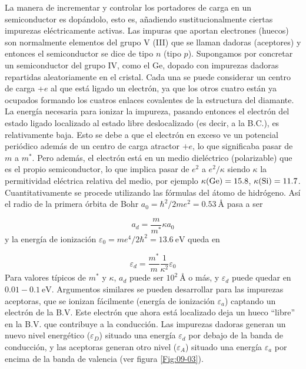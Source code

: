 La manera de incrementar y controlar los portadores de carga en un semiconductor es dopándolo, esto es, añadiendo sustitucionalmente ciertas impurezas eléctricamente activas. Las impuras que aportan electrones (huecos) son normalmente elementos del grupo V (III) que se llaman dadoras (aceptores) y entonces el semiconductor se dice de tipo $n$ (tipo $p$). Supongamos por concretar un semiconductor del grupo IV, como  el Ge, dopado con impurezas dadoras repartidas aleatoriamente en el cristal. Cada una se puede considerar un centro de carga +$e$ al que está ligado un electrón, ya que los otros cuatro están ya ocupados formando los cuatros enlaces covalentes de la estructura del diamante. La energía necesaria para ionizar la impureza, pasando entonces el electrón del estado ligado localizado al estado libre deslocalizado (es decir, a la B.C.), es relativamente baja. Esto se debe a que el electrón en exceso ve un potencial periódico además de un centro de carga atractor $+e$, lo que significaba pasar de $m$ a $m^*$. Pero además, el electrón está en un medio dieléctrico (polarizable) que es el propio semiconductor, lo que implica pasar de $e^2$ a $e^2/\kappa$ siendo $\kappa$ la permitividad eléctrica relativa del medio, por ejemplo $\kappa(\ce{Ge})=15.8$, $\kappa(\ce{Si})=11.7$. Cuantitativamente se procede utilizando las fórmulas del átomo de hidrógeno. Así el radio de la primera órbita de Bohr $a_0=\hbar^2 / 2me^2=0.53 \ \unit{\angstrom}$ pasa a ser
 
\begin{equation}
	a_d = \frac{m}{m^*} \kappa a_0
\end{equation}
y la energía de ionización $\varepsilon_0=me^4/2\hbar^2=13.6 \ \unit{\eV}$ queda en

\begin{equation}
	\varepsilon_d = \frac{m^*}{m} \frac{1}{\kappa^2} \varepsilon_0
\end{equation}
Para valores típicos de $m^*$ y $\kappa$, $a_d$ puede ser $10^2 \ \unit{\angstrom}$ o más, y $\varepsilon_d$ puede quedar en $0.01-0.1 \ \unit{\eV}$. Argumentos similares se pueden desarrollar para las impurezas aceptoras, que se ionizan fácilmente (energía de ionización $\varepsilon_a$) captando un electrón de la B.V. Este electrón que ahora está localizado deja un hueco ``libre'' en la B.V. que contribuye a la conducción. Las impurezas dadoras generan un nuevo nivel  energético ($\varepsilon_D$) situado una energía $\varepsilon_d$ por debajo de la banda de conducción, y las aceptoras generan otro nivel ($\varepsilon_A$) situado una energía $\varepsilon_a$ por encima de la banda de valencia (ver figura \ref{Fig:09-03}).

